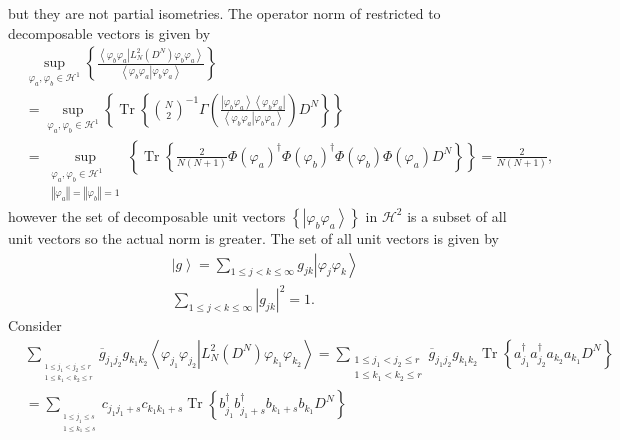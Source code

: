 \documentclass[aps,preprint]{revtex4}%
\begin{document}
but they are not partial isometries. The operator norm of restricted to
decomposable vectors is given by
\begin{align}
&  \sup_{\varphi_{a},\varphi_{b}\in\mathcal{H}^{1}}\left\{  \frac{\left\langle
\left.  \varphi_{b}\varphi_{a}\right\vert L_{N}^{2}\left(  D^{N}\right)
\varphi_{b}\varphi_{a}\right\rangle }{\left\langle \left.  \varphi_{b}%
\varphi_{a}\right\vert \varphi_{b}\varphi_{a}\right\rangle }\right\}
\nonumber\\
&  \left.  =\right.  \sup_{\varphi_{a},\varphi_{b}\in\mathcal{H}^{1}}\left\{
\operatorname{Tr}\left\{  \binom{N}{2}^{-1}\Gamma\left(  \frac{\left\vert
\varphi_{b}\varphi_{a}\right\rangle \left\langle \varphi_{b}\varphi
_{a}\right\vert }{\left\langle \left.  \varphi_{b}\varphi_{a}\right\vert
\varphi_{b}\varphi_{a}\right\rangle }\right)  D^{N}\right\}  \right\}
\nonumber\\
&  \left.  =\right.  \sup_{\substack{\varphi_{a},\varphi_{b}\in\mathcal{H}%
^{1}\\\left\Vert \varphi_{a}\right\Vert =\left\Vert \varphi_{b}\right\Vert
=1}}\left\{  \operatorname{Tr}\left\{  \frac{2}{N\left(  N+1\right)  }%
\Phi\left(  \varphi_{a}\right)  ^{\dagger}\Phi\left(  \varphi_{b}\right)
^{\dagger}\Phi\left(  \varphi_{b}\right)  \Phi\left(  \varphi_{a}\right)
D^{N}\right\}  \right\}  =\frac{2}{N\left(  N+1\right)  },
\end{align}
however the set of decomposable unit vectors $\left\{  \left\vert \varphi
_{b}\varphi_{a}\right\rangle \right\}  $ in $\mathcal{H}^{2}$ is a subset of
all unit vectors so the actual norm is greater. The set of all unit vectors is
given by
\begin{align}
&  \left\vert g\right\rangle =\sum_{1\leq j<k\leq\infty}g_{jk}\left\vert
\varphi_{j}\varphi_{k}\right\rangle \\
&  \sum_{1\leq j<k\leq\infty}\left\vert g_{jk}\right\vert ^{2}=1.
\end{align}
Consider
\begin{align}
&  \sum_{_{\substack{1\leq j_{1}<j_{2}\leq r\\1\leq k_{1}<k_{2}\leq r}%
}}\overline{g}_{j_{1}j_{2}}g_{k_{1}k_{2}}\left\langle \left.  \varphi_{j_{1}%
}\varphi_{j_{2}}\right\vert L_{N}^{2}\left(  D^{N}\right)  \varphi_{k_{1}%
}\varphi_{k_{2}}\right\rangle =\sum_{\substack{1\leq j_{1}<j_{2}\leq r\\1\leq
k_{1}<k_{2}\leq r}}\overline{g}_{j_{1}j_{2}}g_{k_{1}k_{2}}\operatorname{Tr}%
\left\{  a_{j_{1}}^{\dagger}a_{j_{2}}^{\dagger}a_{k_{2}}a_{k_{1}}D^{N}\right\}
\\
&  =\sum_{_{\substack{1\leq j_{1}\leq s\\1\leq k_{1}\leq s}}}c_{j_{1}j_{1}%
+s}c_{k_{1}k_{1}+s}\operatorname{Tr}\left\{  b_{j_{1}}^{\dagger}b_{j_{1}%
+s}^{\dagger}b_{k_{1}+s}b_{k_{1}}D^{N}\right\}
\end{align}
\end{document}
